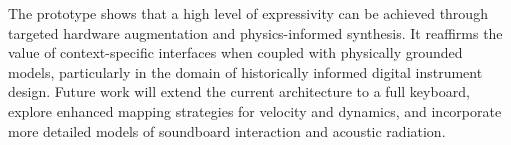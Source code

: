 The prototype shows that a high level of expressivity can be achieved through targeted hardware augmentation and physics-informed synthesis. It reaffirms the value of context-specific interfaces when coupled with physically grounded models, particularly in the domain of historically informed digital instrument design. Future work will extend the current architecture to a full keyboard, explore enhanced mapping strategies for velocity and dynamics, and incorporate more detailed models of soundboard interaction and acoustic radiation.


